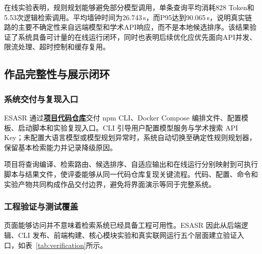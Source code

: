 \documentclass[a4paper,12pt,fontset=none]{ctexart}
\newcommand{\projectlink}[2]{\href{#1}{\textcolor{AcademicBlue}{\textbf{#2}}}}
\begin{document}
在线实验表明，规则规划能够避免部分模型调用，单条查询平均消耗828 Token和5.53次逻辑检索调用。平均墙钟时间为26.743\,s，而P95达到90.065\,s，说明真实链路的主要不确定性来自远端模型和学术API响应，而不是本地候选排序。该结果验证了系统具备可计量的在线运行闭环，同时也表明后续优化应优先面向API并发、限流处理、超时控制和缓存复用。

\subsection{作品完整性与展示闭环}

\subsubsection{系统交付与复现入口}

ESASR 通过\projectlink{https://github.com/esasr/esasr}{项目代码仓库}交付 npm CLI、Docker Compose 编排文件、配置模板、启动脚本和实验复现入口。CLI 引导用户配置模型服务与学术搜索 API Key；未配置大语言模型或模型规划异常时，系统自动切换至确定性规则规划器，保留基本检索能力并记录降级原因。

项目将查询编译、检索路由、候选排序、自适应输出和在线运行分别映射到可执行脚本与结果文件，使评委能够从同一代码仓库复现关键流程。代码、配置、命令和实验产物共同构成作品交付边界，避免将界面演示等同于完整系统。

\subsubsection{工程验证与测试覆盖}

页面能够访问并不意味着检索系统已经具备工程可用性。ESASR 因此从后端逻辑、CLI 发布、前端构建、核心模块实验和真实联网运行五个层面建立验证入口，如表~\ref{tab:verification}所示。
\end{document}
